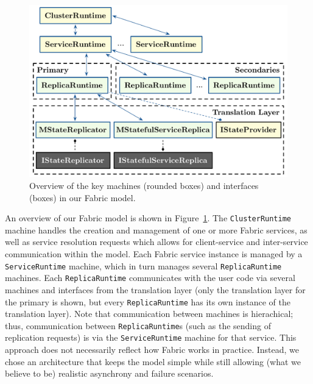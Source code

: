 \begin{figure}[thb]
\centering
\includegraphics[width=\linewidth]{img/fabricmodel}
\caption{Overview of the key machines (rounded boxes) and interfaces (boxes) in our Fabric model.}
\label{fig:fabric_model}
\end{figure}

An overview of our Fabric model is shown in Figure~\ref{fig:fabric_model}.
The \texttt{ClusterRuntime} machine 
handles the creation and management of 
one or more Fabric services,
as well as service resolution requests
which allows for client-service and inter-service communication
within the model.
Each Fabric service instance is managed by a \texttt{ServiceRuntime}
machine, which in turn manages 
several \texttt{ReplicaRuntime} machines.
Each \texttt{ReplicaRuntime} communicates with the user code
via several machines and interfaces from the translation layer
(only the translation layer for the primary is shown,
but every \texttt{ReplicaRuntime} has its own instance of the translation layer).
Note that communication between machines is hierachical;
thus, communication between \texttt{ReplicaRuntime}s
(such as the sending of replication requests)
is via the \texttt{ServiceRuntime} machine for that service.
This approach does not necessarily reflect how Fabric works in practice.
Instead, we chose an architecture
that keeps the model simple
while still allowing (what we believe to be) realistic
asynchrony and failure scenarios.
 

